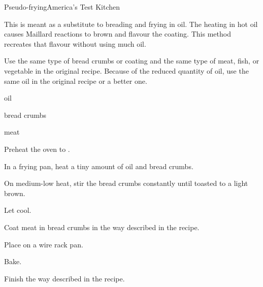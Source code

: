 \begin{recipe}{Pseudo-frying}{America's Test Kitchen}{}

This is meant as a substitute to breading and frying in oil. The heating in hot oil causes Maillard reactions to brown and flavour the coating. This method recreates that flavour without using much oil.

Use the same type of bread crumbs or coating and the same type of meat, fish, or vegetable in the original recipe. Because of the reduced quantity of oil, use the same oil in the original recipe or a better one.

\begin{ingredients}
\item oil
\item bread crumbs
\item meat
\end{ingredients}

\begin{directions}
\item Preheat the oven to .
\item In a frying pan, heat a tiny amount of oil and bread crumbs.
\item On medium-low heat, stir the bread crumbs constantly until toasted to a light brown.
\item Let cool.
\item Coat meat in bread crumbs in the way described in the recipe.
\item Place on a wire rack pan.
\item Bake.
\item Finish the way described in the recipe.
\end{directions}

\end{recipe}
